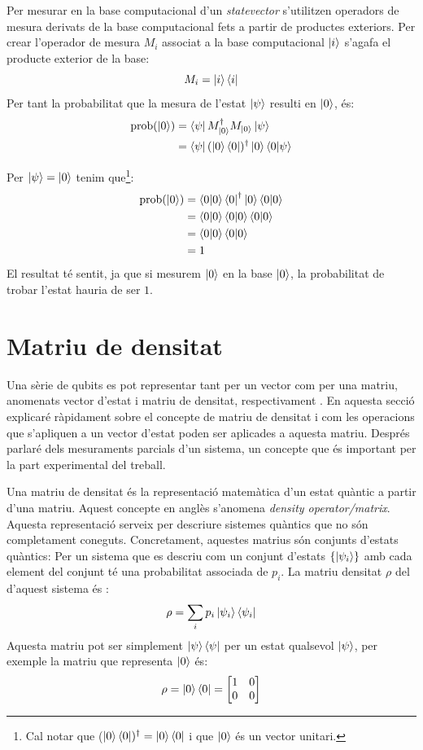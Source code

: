 Per mesurar en la base computacional d'un \textit{statevector} s'utilitzen operadors de mesura derivats de la base computacional fets a partir de productes exteriors. Per crear l'operador de mesura ${M_i}$ associat a la base computacional $\ket{i}$ s'agafa el producte exterior de la base:
$$
M_i = \ket{i}\bra{i}
$$
Per tant la probabilitat que la mesura de l'estat $\ket{\psi}$ resulti en $\ket{0}$, és:
\begin{align*}
	\mathrm{prob}(\ket{0}) &= \bra{\psi}M_{\ket{0}}^{\dagger}M_{\ket{0}} \ket{\psi}\\
	&= \bra{\psi}(\ket{0}\bra{0})^\dagger \ket{0}\bra{0}\ket{\psi} 
\end{align*}


Per $\ket{\psi} = \ket{0}$ tenim que\footnote{Cal notar que ($\ket{0}\bra{0})^\dagger = \ket{0}\bra{0}$ i que $\ket{0}$ és un vector unitari.}:
\begin{align*}
	\mathrm{prob}(\ket{0}) &= \bra{0}\ket{0}\bra{0}^\dagger \ket{0}\bra{0}\ket{0} \\
	&= \bra{0}\ket{0}\bra{0} \ket{0}\bra{0}\ket{0} \\
	&= \bra{0}\ket{0}\bra{0}\ket{0} \\
	&= 1
\end{align*}
El resultat té sentit, ja que si mesurem $\ket{0}$ en la base $\ket{0}$, la probabilitat de trobar l'estat hauria de ser $1$.

\section{Matriu de densitat}
Una sèrie de qubits es pot representar tant per un vector com per una matriu, anomenats vector d'estat i matriu de densitat, respectivament \cite{QCandQI}.
En aquesta secció explicaré ràpidament sobre el concepte de matriu de densitat i com les operacions que s'apliquen a un vector d'estat poden ser aplicades a aquesta matriu. Després parlaré dels mesuraments parcials d'un sistema, un concepte que és important per la part experimental del treball.

Una matriu de densitat és la representació matemàtica d'un estat quàntic a partir d'una matriu. Aquest concepte en anglès s'anomena \textit{density operator/matrix}. Aquesta representació serveix per descriure sistemes quàntics que no són completament coneguts. Concretament, aquestes matrius són conjunts d'estats quàntics: Per un sistema que es descriu com un conjunt d'estats $\{\ket{\psi_i}\}$ amb cada element del conjunt té una probabilitat associada de $p_i$. La matriu densitat $\rho$ del d'aquest sistema és \cite{QCandQI:density_matrix}:
$$
\rho = \sum_i p_i\ket{\psi_i}\bra{\psi_i}
$$
Aquesta matriu pot ser simplement $\ket{\psi}\bra{\psi}$ per un estat qualsevol $\ket{\psi}$, per exemple la matriu que representa $\ket{0}$ és:
$$
\rho = \ket{0}\bra{0} = \begin{bmatrix}
	1 & 0 \\
	0 & 0 
\end{bmatrix}
$$

